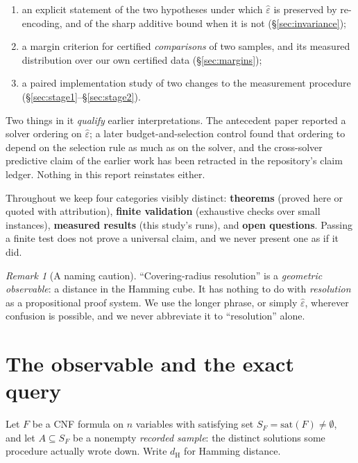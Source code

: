 \documentclass[11pt,a4paper]{article}
\theoremstyle{plain}
\theoremstyle{definition}
\theoremstyle{remark}
\newtheorem{remark}[theorem]{Remark}
\newcommand{\epshat}{\hat{\varepsilon}}
\newcommand{\dH}{d_{\mathrm{H}}}
\newcommand{\SF}{S_F}
\begin{document}
\begin{enumerate}[nosep]
\item an explicit statement of the two hypotheses under which $\epshat$ is
      preserved by re-encoding, and of the sharp additive bound when it is not
      (\S\ref{sec:invariance});
\item a margin criterion for certified \emph{comparisons} of two samples, and
      its measured distribution over our own certified data
      (\S\ref{sec:margins});
\item a paired implementation study of two changes to the measurement
      procedure (\S\ref{sec:stage1}--\S\ref{sec:stage2}).
\end{enumerate}

Two things in it \emph{qualify} earlier interpretations. The antecedent paper
reported a solver ordering on $\epshat$; a later budget-and-selection control
found that ordering to depend on the selection rule as much as on the solver,
and the cross-solver predictive claim of the earlier work has been retracted in
the repository's claim ledger. Nothing in this report reinstates either.

Throughout we keep four categories visibly distinct: \textbf{theorems} (proved
here or quoted with attribution), \textbf{finite validation} (exhaustive checks
over small instances), \textbf{measured results} (this study's runs), and
\textbf{open questions}. Passing a finite test does not prove a universal claim,
and we never present one as if it did.

\begin{remark}[A naming caution]
``Covering-radius resolution'' is a \emph{geometric observable}: a distance in
the Hamming cube. It has nothing to do with \emph{resolution} as a propositional
proof system. We use the longer phrase, or simply $\epshat$, wherever confusion
is possible, and we never abbreviate it to ``resolution'' alone.
\end{remark}

\section{The observable and the exact query}

Let $F$ be a CNF formula on $n$ variables with satisfying set
$\SF = \mathrm{sat}(F) \neq \emptyset$, and let $A \subseteq \SF$ be a nonempty
\emph{recorded sample}: the distinct solutions some procedure actually wrote
down. Write $\dH$ for Hamming distance.
\end{document}
